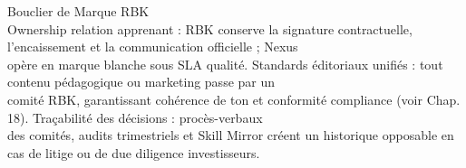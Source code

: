 \vspace{0.5em}
\vspace{0.5em}
Bouclier de Marque RBK\\
\vspace{0.5em}
Ownership relation apprenant : RBK conserve la signature contractuelle, l’encaissement et la communication officielle ; Nexus\\
opère en marque blanche sous SLA qualité. Standards éditoriaux unifiés : tout contenu pédagogique ou marketing passe par un\\
comité RBK, garantissant cohérence de ton et conformité compliance (voir Chap. 18). Traçabilité des décisions : procès-verbaux\\
des comités, audits trimestriels et Skill Mirror créent un historique opposable en cas de litige ou de due diligence investisseurs.\\
\vspace{0.5em}
\vspace{0.5em}
